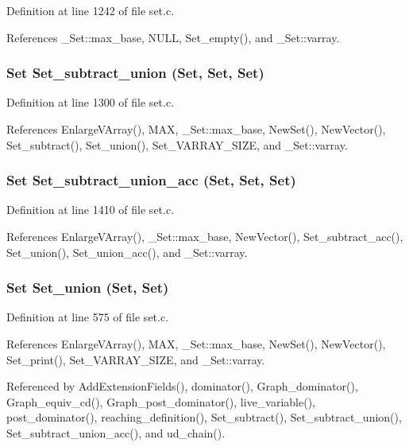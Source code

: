 Definition at line 1242 of file set.c.

References \_\-Set::max\_\-base, NULL, Set\_\-empty(), and \_\-Set::varray.
\subsubsection{\setlength{\rightskip}{0pt plus 5cm}\bf{Set} Set\_\-subtract\_\-union (\bf{Set}, \bf{Set}, \bf{Set})}\label{set_8h_3b53887f903d1efd23b6423a4cb040b7}




Definition at line 1300 of file set.c.

References Enlarge\-VArray(), MAX, \_\-Set::max\_\-base, New\-Set(), New\-Vector(), Set\_\-subtract(), Set\_\-union(), Set\_\-VARRAY\_\-SIZE, and \_\-Set::varray.
\subsubsection{\setlength{\rightskip}{0pt plus 5cm}\bf{Set} Set\_\-subtract\_\-union\_\-acc (\bf{Set}, \bf{Set}, \bf{Set})}\label{set_8h_bda535b9a49bba856098274b9be53b66}




Definition at line 1410 of file set.c.

References Enlarge\-VArray(), \_\-Set::max\_\-base, New\-Vector(), Set\_\-subtract\_\-acc(), Set\_\-union(), Set\_\-union\_\-acc(), and \_\-Set::varray.
\subsubsection{\setlength{\rightskip}{0pt plus 5cm}\bf{Set} Set\_\-union (\bf{Set}, \bf{Set})}\label{set_8h_c43a2ecd9db125353e3aa8bd263dfe5a}




Definition at line 575 of file set.c.

References Enlarge\-VArray(), MAX, \_\-Set::max\_\-base, New\-Set(), New\-Vector(), Set\_\-print(), Set\_\-VARRAY\_\-SIZE, and \_\-Set::varray.

Referenced by Add\-Extension\-Fields(), dominator(), Graph\_\-dominator(), Graph\_\-equiv\_\-cd(), Graph\_\-post\_\-dominator(), live\_\-variable(), post\_\-dominator(), reaching\_\-definition(), Set\_\-subtract(), Set\_\-subtract\_\-union(), Set\_\-subtract\_\-union\_\-acc(), and ud\_\-chain().
